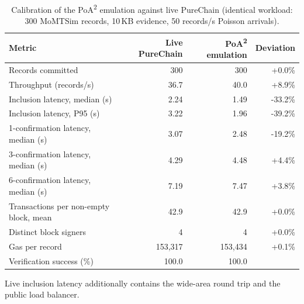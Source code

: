 \begin{table}[t]
\centering
\small
\caption{Calibration of the PoA\textsuperscript{2} emulation against live PureChain (identical workload: 300 MoMTSim records, 10\,KB evidence, 50 records/s Poisson arrivals).}
\label{tab:calibration}
\begin{tabular}{lrrr}
\toprule
Metric & Live PureChain & PoA\textsuperscript{2} emulation & Deviation \\
\midrule
Records committed & 300 & 300 & +0.0\% \\
Throughput (records/s) & 36.7 & 40.0 & +8.9\% \\
Inclusion latency, median (s) & 2.24 & 1.49 & -33.2\% \\
Inclusion latency, P95 (s) & 3.22 & 1.96 & -39.2\% \\
1-confirmation latency, median (s) & 3.07 & 2.48 & -19.2\% \\
3-confirmation latency, median (s) & 4.29 & 4.48 & +4.4\% \\
6-confirmation latency, median (s) & 7.19 & 7.47 & +3.8\% \\
Transactions per non-empty block, mean & 42.9 & 42.9 & +0.0\% \\
Distinct block signers & 4 & 4 & +0.0\% \\
Gas per record & 153,317 & 153,434 & +0.1\% \\
Verification success (\%) & 100.0 & 100.0 &  \\
\bottomrule
\end{tabular}
\par\smallskip\footnotesize Live inclusion latency additionally contains the wide-area round trip and the public load balancer.
\end{table}
